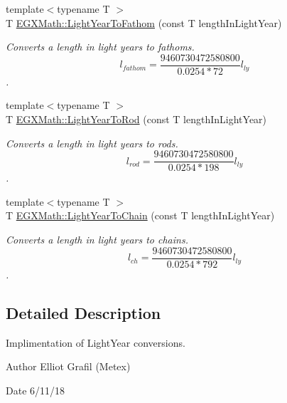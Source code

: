 \begin{DoxyCompactItemize}
{\footnotesize template$<$typename T $>$ }\\T \mbox{\hyperlink{group___e_g_x_math-_conversions-_length_conversions-_astronomical-_light_year-_nautical_gad53c415df3fcb65654ccf0d1cd79ef4a}{E\+G\+X\+Math\+::\+Light\+Year\+To\+Fathom}} (const T length\+In\+Light\+Year)
\begin{DoxyCompactList}\small\item\em Converts a length in light years to fathoms. \[ l_{fathom}= \frac{9460730472580800}{0.0254 * 72} l_{ly} \]. \end{DoxyCompactList}\item 
{\footnotesize template$<$typename T $>$ }\\T \mbox{\hyperlink{group___e_g_x_math-_conversions-_length_conversions-_astronomical-_light_year-_surveyors_ga8cb7f2e1dbbe56d0d87ce11015d4fdb6}{E\+G\+X\+Math\+::\+Light\+Year\+To\+Rod}} (const T length\+In\+Light\+Year)
\begin{DoxyCompactList}\small\item\em Converts a length in light years to rods. \[ l_{rod}= \frac{9460730472580800}{0.0254 * 198} l_{ly} \]. \end{DoxyCompactList}\item 
{\footnotesize template$<$typename T $>$ }\\T \mbox{\hyperlink{group___e_g_x_math-_conversions-_length_conversions-_astronomical-_light_year-_surveyors_gabfcaf18acf4aeceaaed2699ebc9c3e1d}{E\+G\+X\+Math\+::\+Light\+Year\+To\+Chain}} (const T length\+In\+Light\+Year)
\begin{DoxyCompactList}\small\item\em Converts a length in light years to chains. \[ l_{ch}= \frac{9460730472580800}{0.0254 * 792} l_{ly} \]. \end{DoxyCompactList}\end{DoxyCompactItemize}


\subsection{Detailed Description}
Implimentation of Light\+Year conversions. 

\begin{DoxyAuthor}{Author}
Elliot Grafil (Metex) 
\end{DoxyAuthor}
\begin{DoxyDate}{Date}
6/11/18 
\end{DoxyDate}
